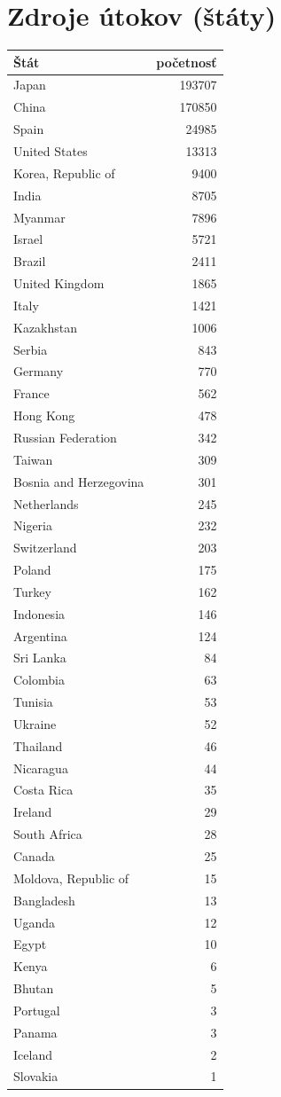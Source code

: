 \documentclass[12pt, oneside]{book}
\begin{document}
\section*{Zdroje útokov (štáty)}
\tiny
\begin{longtable}{|l|r|}
\hline
Štát&početnosť\\
\hline
Japan&193707\\ 
China&170850\\ 
Spain&24985\\ 
United States&13313\\ 
Korea, Republic of&9400\\ 
India&8705\\ 
Myanmar&7896\\ 
Israel&5721\\ 
Brazil&2411\\ 
United Kingdom&1865\\ 
Italy&1421\\ 
Kazakhstan&1006\\ 
Serbia&843\\ 
Germany&770\\ 
France&562\\ 
Hong Kong&478\\ 
Russian Federation&342\\ 
Taiwan&309\\ 
Bosnia and Herzegovina&301\\ 
Netherlands&245\\ 
Nigeria&232\\ 
Switzerland&203\\ 
Poland&175\\ 
Turkey&162\\ 
Indonesia&146\\ 
Argentina&124\\ 
Sri Lanka&84\\ 
Colombia&63\\ 
Tunisia&53\\ 
Ukraine&52\\ 
Thailand&46\\ 
Nicaragua&44\\ 
Costa Rica&35\\ 
Ireland&29\\ 
South Africa&28\\ 
Canada&25\\ 
Moldova, Republic of&15\\ 
Bangladesh&13\\ 
Uganda&12\\ 
Egypt&10\\ 
Kenya&6\\ 
Bhutan&5\\ 
Portugal&3\\ 
Panama&3\\ 
Iceland&2\\
Slovakia&1\\ 
\hline
\end{longtable}
	 
\newpage	

%
%
%
\end{document}
